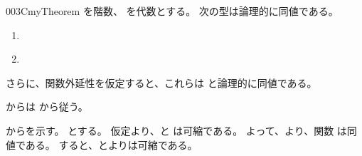 \documentclass[index]{subfiles}
\begin{document}
\begin{myBlock}{003C}{myTheorem}
  を階数、
  を\myInlineMath{\myNat}代数とする。
  次の型は論理的に同値である。
  \begin{enumerate}
  \item \label{003C:0000} 
  \item \label{003C:0001} 
  \end{enumerate}
  さらに、関数外延性を仮定すると、これらは
  と論理的に同値である。
\end{myBlock}
\begin{myProof}
  からは
  から従う。

  からを示す。
  とする。
  仮定より、と
  は可縮である。
  よって、より、関数
  は同値である。
  すると、とよりは可縮である。
\end{myProof}
\end{document}
